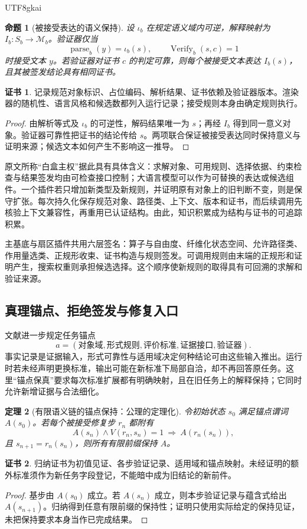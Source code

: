 \documentclass[11pt,a4paper]{article}
\theoremstyle{plain}
\newtheorem{theorem}{定理}[section]
\newtheorem{proposition}[theorem]{命题}
\theoremstyle{definition}
\newtheorem*{certificate}{证书}
\theoremstyle{remark}
\begin{document}
\begin{CJK*}{UTF8}{gkai}
\begin{proposition}[被接受表达的语义保持]
\label{ss:render}
设 $\iota_b$ 在规定语义域内可逆，解释映射为 $I_b:S_b\to\mathcal M_b$。验证器仅当
\[
 \operatorname{parse}_b(y)=\iota_b(s),\qquad
 \operatorname{Verify}_b(s,c)=1
\]
时接受文本 $y$。若验证器对证书 $c$ 的判定可靠，则每个被接受文本表达 $I_b(s)$，且其被签发结论具有相同证书。
\end{proposition}
\begin{certificate}
记录规范对象标识、占位编码、解析结果、证书依赖及验证器版本。渲染器的随机性、语言风格和候选数都列入运行记录；接受规则本身由确定规则执行。
\end{certificate}
\begin{proof}
由解析等式及 $\iota_b$ 的可逆性，解码结果唯一为 $s$；再经 $I_b$ 得到同一意义对象。验证器可靠性把证书的结论传给 $s$。两项联合保证被接受表达同时保持意义与证明来源；候选文本如何产生不影响这一推导。
\end{proof}

原文所称“白盒主权”据此具有具体含义：求解对象、可用规则、选择依据、约束检查与结果签发均由可检查接口控制；大语言模型可以作为可替换的表达或候选组件。一个插件若只增加新类型及新规则，并证明原有对象上的旧判断不变，则是保守扩张。每次持久化保存规范对象、路径类、上下文、版本和证书，而后续调用先核验上下文兼容性，再重用已认证结构。由此，知识积累成为结构与证书的可追踪积累。

主基底与扇区插件共用六层签名：算子与自由度、纤维化状态空间、允许路径类、作用量选类、正规形收束、证书构造与规则签发。可调用规则由末端的正规形和证明产生，搜索权重则承担候选选择。这个顺序使新规则的取得具有可回溯的求解和验证来源。

\subsection{真理锚点、拒绝签发与修复入口}

文献\cite{S30,S31}进一步规定任务锚点
\[
 a=(\text{对象域},\text{形式规则},\text{评价标准},\text{证据接口},\text{验证器}).
\]
事实记录是证据输入，形式可靠性与适用域决定何种结论可由这些输入推出。运行时若未经声明更换标准，输出可能在新标准下局部自洽，却不再回答原任务。这里“锚点保真”要求每次标准扩展都有明确映射，且在旧任务上的解释保持；它同时允许新增证据与合法细化。

\begin{theorem}[有限语义链的锚点保持：公理的定理化]
\label{ss:anchor}
令初始状态 $s_0$ 满足锚点谓词 $A(s_0)$。若每个被接受修复步 $r_n$ 都附有
\[
 A(s_n)\wedge V(r_n,s_n)=1\ \Longrightarrow\ A(r_n(s_n)),
\]
且 $s_{n+1}=r_n(s_n)$，则所有有限前缀保持 $A$。
\end{theorem}
\begin{certificate}
归纳证书为初值见证、各步验证记录、适用域和锚点映射。未经证明的额外标准须作为新任务字段登记，不能暗中成为旧结论的新前件。
\end{certificate}
\begin{proof}
基步由 $A(s_0)$ 成立。若 $A(s_n)$ 成立，则本步验证记录与蕴含式给出 $A(s_{n+1})$。归纳得到任意有限前缀的保持性；证明只使用实际给定的保持见证，未把保持要求本身当作已完成结果。
\end{proof}


\end{CJK*}
\end{document}
